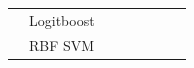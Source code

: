 \documentclass[12pt]{article}
\begin{document}
\begin{sloppypar}
\begin{table}[hbt!]
\begin{tabular}{lllllllll}
                                       & \multicolumn{2}{l}{Logitboost}                            &                                 &                                  &                                  &                                 &                                  &                                  \\
                                       & \multicolumn{2}{l}{RBF SVM}                               & \multicolumn{6}{c}{}                                                                                                                                                                                          \\ \hline
\end{tabular}
\end{table}

\newpage




\end{sloppypar}
\end{document}
